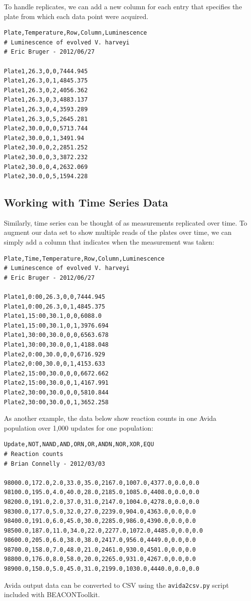 To handle replicates, we can add a new column for each entry that
specifies the plate from which each data point were acquired.

\begin{lstlisting}
Plate,Temperature,Row,Column,Luminescence
# Luminescence of evolved V. harveyi
# Eric Bruger - 2012/06/27

Plate1,26.3,0,0,7444.945
Plate1,26.3,0,1,4845.375
Plate1,26.3,0,2,4056.362
Plate1,26.3,0,3,4883.137
Plate1,26.3,0,4,3593.289
Plate1,26.3,0,5,2645.281
Plate2,30.0,0,0,5713.744
Plate2,30.0,0,1,3491.94
Plate2,30.0,0,2,2851.252
Plate2,30.0,0,3,3872.232
Plate2,30.0,0,4,2632.069
Plate2,30.0,0,5,1594.228
\end{lstlisting}
\subsection{Working with Time Series Data}

Similarly, time series can be thought of as measurements replicated over
time. To augment our data set to show multiple reads of the plates over
time, we can simply add a column that indicates when the measurement was
taken:

\begin{lstlisting}
Plate,Time,Temperature,Row,Column,Luminescence
# Luminescence of evolved V. harveyi
# Eric Bruger - 2012/06/27

Plate1,0:00,26.3,0,0,7444.945
Plate1,0:00,26.3,0,1,4845.375
Plate1,15:00,30.1,0,0,6088.0
Plate1,15:00,30.1,0,1,3976.694
Plate1,30:00,30.0,0,0,6563.678
Plate1,30:00,30.0,0,1,4188.048
Plate2,0:00,30.0,0,0,6716.929
Plate2,0:00,30.0,0,1,4153.633
Plate2,15:00,30.0,0,0,6672.662
Plate2,15:00,30.0,0,1,4167.991
Plate2,30:00,30.0,0,0,5810.844
Plate2,30:00,30.0,0,1,3652.258
\end{lstlisting}
As another example, the data below show reaction counts in one Avida
population over 1,000 updates for one population:

\begin{lstlisting}
Update,NOT,NAND,AND,ORN,OR,ANDN,NOR,XOR,EQU
# Reaction counts
# Brian Connelly - 2012/03/03

98000.0,172.0,2.0,33.0,35.0,2167.0,1007.0,4377.0,0.0,0.0
98100.0,195.0,4.0,40.0,28.0,2185.0,1085.0,4408.0,0.0,0.0
98200.0,191.0,2.0,37.0,31.0,2147.0,1004.0,4278.0,0.0,0.0
98300.0,177.0,5.0,32.0,27.0,2239.0,904.0,4363.0,0.0,0.0
98400.0,191.0,6.0,45.0,30.0,2285.0,986.0,4390.0,0.0,0.0
98500.0,187.0,11.0,34.0,22.0,2277.0,1072.0,4485.0,0.0,0.0
98600.0,205.0,6.0,38.0,38.0,2417.0,956.0,4449.0,0.0,0.0
98700.0,158.0,7.0,48.0,21.0,2461.0,930.0,4501.0,0.0,0.0
98800.0,176.0,8.0,58.0,20.0,2265.0,931.0,4267.0,0.0,0.0
98900.0,150.0,5.0,45.0,31.0,2199.0,1030.0,4440.0,0.0,0.0
\end{lstlisting}
Avida output data can be converted to CSV using the
\lstinline!avida2csv.py! script included with BEACONToolkit.


